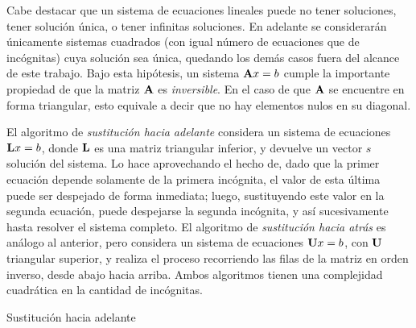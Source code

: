         Cabe destacar que un sistema de ecuaciones lineales puede no tener soluciones, tener solución única, o tener infinitas soluciones. En adelante se considerarán únicamente sistemas cuadrados (con igual número de ecuaciones que de incógnitas) cuya solución sea única, quedando los demás casos fuera del alcance de este trabajo. Bajo esta hipótesis, un sistema $\mathbf{A}x=b$ cumple la importante propiedad de que la matriz $\mathbf{A}$ es \emph{inversible}. En el caso de que $\mathbf{A}$ se encuentre en forma triangular, esto equivale a decir que no hay elementos nulos en su diagonal.

        El algoritmo de \emph{sustitución hacia adelante} considera un sistema de ecuaciones $\mathbf{L}x=b$, donde $\mathbf{L}$ es una matriz triangular inferior, y devuelve un vector $s$ solución del sistema. Lo hace aprovechando el hecho de, dado que la primer ecuación depende solamente de la primera incógnita, el valor de esta última puede ser despejado de forma inmediata; luego, sustituyendo este valor en la segunda ecuación, puede despejarse la segunda incógnita, y así sucesivamente hasta resolver el sistema completo. El algoritmo de \emph{sustitución hacia atrás} es análogo al anterior, pero considera un sistema de ecuaciones $\mathbf{U}x=b$, con $\mathbf{U}$ triangular superior, y realiza el proceso recorriendo las filas de la matriz en orden inverso, desde abajo hacia arriba. Ambos algoritmos tienen una complejidad cuadrática en la cantidad de incógnitas.

        \vspace{.5em}
        \begin{algorithm}[H]
            \caption{Sustitución hacia adelante} \label{alg:forward-substitution}
        \end{algorithm}
        \vspace{.5em}

